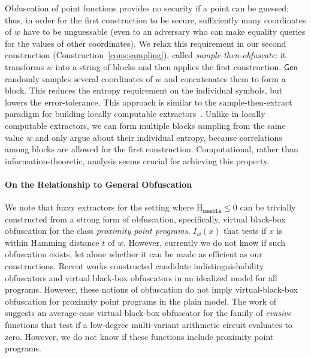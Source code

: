 \documentclass[11pt]{article}
\newcommand{\consref}[1]{\mbox{Construction~\ref{#1}}}
\newcommand{\class}[1]{{\ensuremath{\mathsf{#1}}}}
\newcommand{\gen}{\ensuremath{\class{Gen}}\xspace}
\newcommand{\Huse}{\mathrm{H}_{\mathtt{usable}}}
\begin{document}
Obfuscation of point functions provides no security if a point can be guessed; thus, in order for the first construction to be secure, sufficiently many coordinates of $w$ have to be unguessable (even to an adversary who can make equality queries for the values of other coordinates). We relax this requirement in our second construction (\consref{cons:sampling}), called \emph{sample-then-obfuscate}: it transforms $w$ into a string of blocks and then applies the first construction. $\gen$ randomly samples several coordinates of $w$ and concatenates them to form a block. This reduces the entropy requirement on the individual symbols, but lowers the error-tolerance. This approach is similar to the sample-then-extract paradigm for building locally computable extractors~\cite{lu2002hyper,vadhan2003constructing}.  Unlike in locally computable extractors, we can form multiple blocks sampling from the same value $w$ and only argue about their individual entropy, because correlations among blocks are allowed for the first construction. Computational, rather than information-theoretic, analysis seems crucial for achieving this property.

\paragraph{On the Relationship to General Obfuscation}
We note that fuzzy extractors for the setting where $\Huse\le 0$ can be trivially constructed from a strong form of obfuscation, specifically, virtual black-box obfuscation for the class {\em proximity point programs}, $I_w(x)$ that tests if $x$ is within Hamming distance $t$ of $w$. However, currently we do not know if such obfuscation exists, let alone whether it can be made as efficient as our constructions. Recent works constructed candidate indistinguishability obfuscators \cite{GargGH0SW13,PassTS13} and virtual black-box obfuscators in an idealized model \cite{BrakerskiR13,BarakGKPS13} for all programs. However, these notions of obfuscation do not imply virtual-black-box obfuscation for proximity point programs in the plain model. The work of \cite{BarakBCKPS13} suggests an average-case virtual-black-box obfuscator for the family of {\em evasive} functions that test if a low-degree multi-variant arithmetic circuit evaluates to zero. However, we do not know if these functions include proximity point programs.
\end{document}
